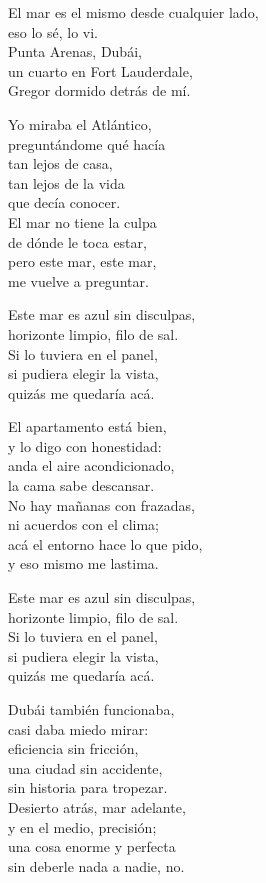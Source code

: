 \begin{lyrics}
El mar es el mismo desde cualquier lado,\\
eso lo sé, lo vi.\\
Punta Arenas, Dubái,\\
un cuarto en Fort Lauderdale,\\
Gregor dormido detrás de mí.

Yo miraba el Atlántico,\\
preguntándome qué hacía\\
tan lejos de casa,\\
tan lejos de la vida\\
que decía conocer.\\
El mar no tiene la culpa\\
de dónde le toca estar,\\
pero este mar, este mar,\\
me vuelve a preguntar.

Este mar es azul sin disculpas,\\
horizonte limpio, filo de sal.\\
Si lo tuviera en el panel,\\
si pudiera elegir la vista,\\
quizás me quedaría acá.

El apartamento está bien,\\
y lo digo con honestidad:\\
anda el aire acondicionado,\\
la cama sabe descansar.\\
No hay mañanas con frazadas,\\
ni acuerdos con el clima;\\
acá el entorno hace lo que pido,\\
y eso mismo me lastima.

Este mar es azul sin disculpas,\\
horizonte limpio, filo de sal.\\
Si lo tuviera en el panel,\\
si pudiera elegir la vista,\\
quizás me quedaría acá.

Dubái también funcionaba,\\
casi daba miedo mirar:\\
eficiencia sin fricción,\\
una ciudad sin accidente,\\
sin historia para tropezar.\\
Desierto atrás, mar adelante,\\
y en el medio, precisión;\\
una cosa enorme y perfecta\\
sin deberle nada a nadie, no.


\end{lyrics}
